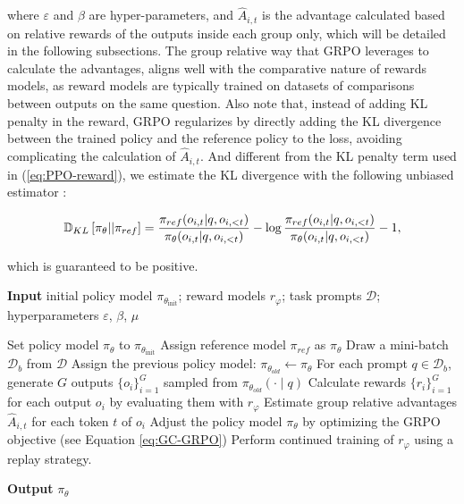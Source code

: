 \begin{itemize}[topsep=0pt]
\begin{itemize}[topsep=0pt]
where $\varepsilon$ and $\beta$ are hyper-parameters, and $\hat{A}_{i,t}$  is the advantage calculated based on relative rewards of the outputs inside each group only, which will be detailed in the following subsections. The group relative way that GRPO leverages to calculate the advantages, aligns well with the comparative nature of rewards models,  as reward models are typically trained on datasets of comparisons between outputs on the same question. Also note that, instead of adding KL penalty in the reward, GRPO regularizes by directly adding the KL divergence between the trained policy and the reference policy to the loss, avoiding complicating the calculation of  $\hat{A}_{i,t}$. And different from the KL penalty term used in (\ref{eq:PPO-reward}), we estimate the KL divergence with the following unbiased estimator \citep{kl_approx}:

\begin{equation}
\small
    \mathbb{D}_{KL}\left[\pi_{\theta} || \pi_{ref}\right] = \frac{\pi_{ref}(o_{i,t}|q,o_{i,<t})}{\pi_{\theta}(o_{i,t}|q,o_{i,<t})} - \log\frac{\pi_{ref}(o_{i,t}|q,o_{i,<t})}{\pi_{\theta}(o_{i,t}|q,o_{i,<t})} - 1,
\end{equation}

which is guaranteed to be positive.

\begin{algorithm}[t]
  \small
  \caption{Iterative Group Relative Policy Optimization}
  \textbf{Input} initial policy model $\pi_{\theta_{\text{init}}}$; reward models $r_\varphi$; task prompts $\mathcal{D}$; 
  hyperparameters $\varepsilon$, $\beta$, $\mu$
  \begin{algorithmic}[1]
    \State Set policy model $\pi_\theta$ to $\pi_{\theta_{\text{init}}}$
       \State Assign reference model $\pi_{ref}$ as $\pi_{\theta}$
      \State Draw a mini-batch $\mathcal{D}_b$ from $\mathcal{D}$
      \State Assign the previous policy model: $\pi_{\theta_{old}} \gets \pi_{\theta}$ 
      \State For each prompt $q \in \mathcal{D}_b$, generate $G$ outputs $\{o_i\}_{i=1}^G$ sampled from $\pi_{\theta_{old}} (\cdot \mid q)$
      \State Calculate rewards $\{r_i\}_{i=1}^{G}$ for each output $o_i$ by evaluating them with $r_{\varphi}$
      \State Estimate group relative advantages $\hat{A}_{i,t}$ for each token $t$ of $o_i$
        \State Adjust the policy model $\pi_{\theta}$ by optimizing the GRPO objective (see Equation \ref{eq:GC-GRPO})
      \EndFor
    \EndFor \State Perform continued training of $r_\varphi$ using a replay strategy. 
    \EndFor 
  \end{algorithmic}
  \textbf{Output} $\pi_\theta$
  \label{alg:iter-grpo}
\end{algorithm}


\end{itemize}
\end{itemize}
